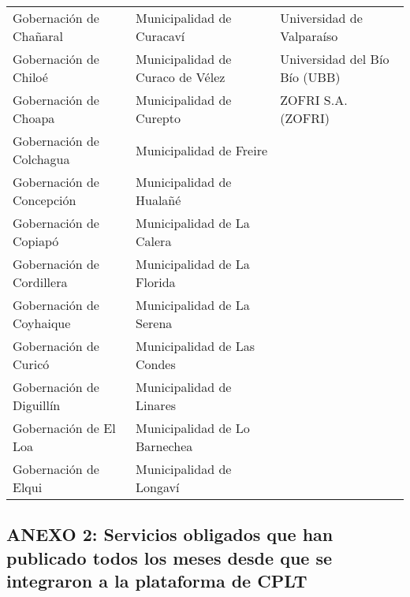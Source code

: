 \documentclass[11pt]{article}
\begin{document}
\begin{longtable}{ p{5cm} | p{5cm} | p{5cm} }
                           Gobernación de Chañaral &                          Municipalidad de Curacaví &                          Universidad de Valparaíso \\
                             Gobernación de Chiloé &                   Municipalidad de Curaco de Vélez &                      Universidad del Bío Bío (UBB) \\
                             Gobernación de Choapa &                           Municipalidad de Curepto &                                ZOFRI S.A.  (ZOFRI) \\
                          Gobernación de Colchagua &                            Municipalidad de Freire &                                                    \\
                         Gobernación de Concepción &                           Municipalidad de Hualañé &                                                    \\
                            Gobernación de Copiapó &                         Municipalidad de La Calera &                                                    \\
                         Gobernación de Cordillera &                        Municipalidad de La Florida &                                                    \\
                          Gobernación de Coyhaique &                         Municipalidad de La Serena &                                                    \\
                             Gobernación de Curicó &                        Municipalidad de Las Condes &                                                    \\
                          Gobernación de Diguillín &                           Municipalidad de Linares &                                                    \\
                             Gobernación de El Loa &                      Municipalidad de Lo Barnechea &                                                    \\
                              Gobernación de Elqui &                           Municipalidad de Longaví &                                                    \\
\end{longtable}

    
    \hypertarget{anexo-2-servicios-obligados-que-han-publicado-todos-los-meses-desde-que-se-integraron-a-la-plataforma-de-cplt}{%
\subsection{ANEXO 2: Servicios obligados que han publicado todos los
meses desde que se integraron a la plataforma de
CPLT}\label{anexo-2-servicios-obligados-que-han-publicado-todos-los-meses-desde-que-se-integraron-a-la-plataforma-de-cplt}}
\end{document}
